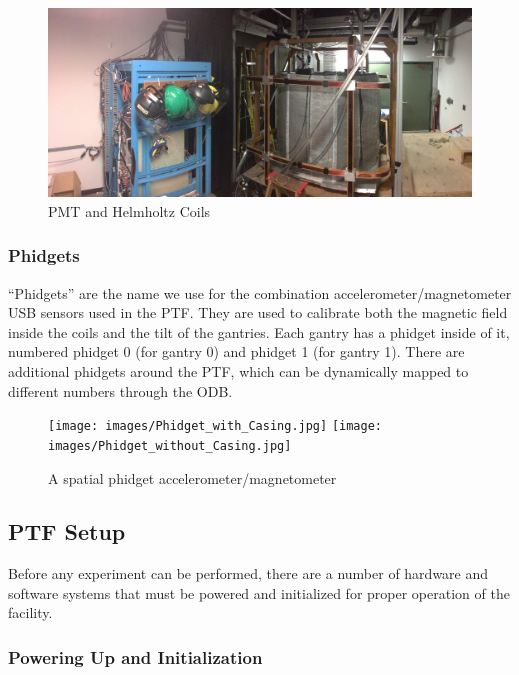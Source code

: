 \documentclass[twoside,letterpaper]{refart}
\begin{document}
\begin{figure}[!htpb]\centering	
	\includegraphics[width=\textwidth]{images/panoPTF}
	\caption{PMT and Helmholtz Coils\label{fig:pmtAndCoils}}
\end{figure}



\subsubsection{Phidgets}

``Phidgets'' are the name we use for the combination accelerometer/magnetometer USB sensors used in the PTF. They are used to calibrate both the magnetic field inside the coils and the tilt of the gantries. Each gantry has a phidget inside of it, numbered phidget 0 (for gantry 0) and phidget 1 (for gantry 1). There are additional phidgets around the PTF, which can be dynamically mapped to different numbers through the ODB.


\begin{figure}[!htpb]\centering
	\texttt{[image: images/Phidget\_with\_Casing.jpg]}
	\texttt{[image: images/Phidget\_without\_Casing.jpg]}
	\caption{A spatial phidget accelerometer/magnetometer\label{fig:phidget}}
\end{figure}

\FloatBarrier

\clearpage


\subsection{PTF Setup}

Before any experiment can be performed, there are a number of hardware and software systems that must be powered and initialized for proper operation of the facility.

\subsubsection{Powering Up and Initialization}
\end{document}
